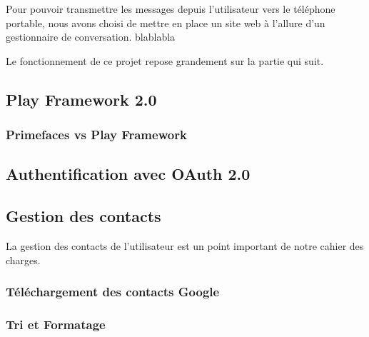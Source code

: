 Pour pouvoir transmettre les messages depuis l'utilisateur vers le téléphone portable, nous avons
choisi de mettre en place un site web à l'allure d'un gestionnaire de conversation. 
blablabla

Le fonctionnement de ce projet repose grandement sur la partie qui suit.
\\


\subsection{Play Framework 2.0}

\subsubsection{Primefaces vs Play Framework}



\subsection{Authentification avec OAuth 2.0} %



\subsection{Gestion des contacts}

La gestion des contacts de l'utilisateur est un point important de notre cahier des charges.
\\

\subsubsection{Téléchargement des contacts Google}

\subsubsection{Tri et Formatage}

